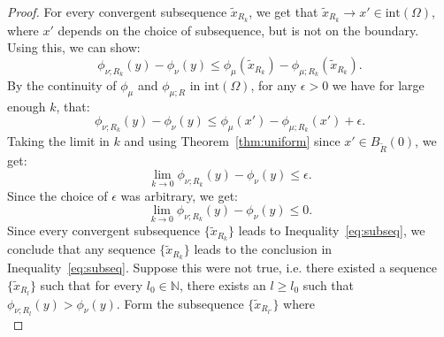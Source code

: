 \documentclass{amsart}
\theoremstyle{lemma}
\theoremstyle{remark}
\begin{document}
\begin{proof}

For every convergent subsequence $\tilde{x}_{R_{k}}$, we get that $\tilde{x}_{R_{k}} \rightarrow x' \in \text{int}(\Omega)$, where $x'$ depends on the choice of subsequence, but is not on the boundary. Using this, we can show:
\begin{equation}\label{eq:xtilde2}
\phi_{\nu;R_{k}}(y) - \phi_{\nu}(y) \leq \phi_{\mu}(\tilde{x}_{R_{k}}) - \phi_{\mu;R_{k}}(\tilde{x}_{R_{k}}).
\end{equation}
By the continuity of $\phi_{\mu}$ and $\phi_{\mu;R}$ in $\text{int}(\Omega)$, for any $\epsilon>0$ we have for large enough $k$, that:
\begin{equation}\label{eq:xRtilde}
\phi_{\nu;R_{k}}(y) - \phi_{\nu}(y) \leq \phi_{\mu}(x') - \phi_{\mu;R_{k}}(x') + \epsilon.
\end{equation}
Taking the limit in $k$ and using Theorem~\ref{thm:uniform} since $x' \in B_{\tilde{R}}(0)$, we get:
\begin{equation}
\lim_{k \rightarrow 0} \phi_{\nu;R_{k}}(y) - \phi_{\nu}(y) \leq \epsilon.
\end{equation}
Since the choice of $\epsilon$ was arbitrary, we get:
\begin{equation}\label{eq:subseq}
\lim_{k \rightarrow 0} \phi_{\nu;R_{k}}(y) - \phi_{\nu}(y) \leq 0.
\end{equation}
Since every convergent subsequence $\{ \tilde{x}_{R_{k}} \}$ leads to Inequality~\eqref{eq:subseq}, we conclude that any sequence $\{ \tilde{x}_{R_{k}} \}$ leads to the conclusion in Inequality~\eqref{eq:subseq}. Suppose this were not true, i.e. there existed a sequence $\{ \tilde{x}_{R_{l}} \}$ such that for every $l_0 \in \mathbb{N}$, there exists an $l \geq l_0$ such that $\phi_{\nu;R_{l}}(y) > \phi_{\nu}(y)$. Form the subsequence $\{ \tilde{x}_{R_{l'}} \}$ where
\begin{equation}\label{eq:strict}

\end{equation}
\end{proof}
\end{document}
